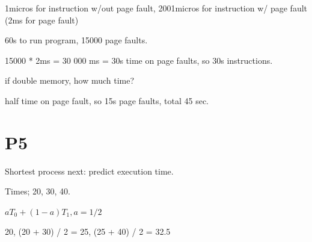 \documentclass[11pt]{article}
\begin{document}
1micros for instruction w/out page fault, 2001micros for instruction w/ page fault (2ms for page fault)

60s to run program, 15000 page faults.

15000 * 2ms = 30 000 ms = 30s time on page faults, so 30s instructions.

if double memory, how much time?

half time on page fault, so 15s page faults, total 45 sec.


\section{P5}
Shortest process next: predict execution time.

Times; 20, 30, 40.

$a T_0 + (1-a) T_1, a = 1/2$

20, (20 + 30) / 2 = 25, (25 + 40) / 2 = 32.5
\end{document}
